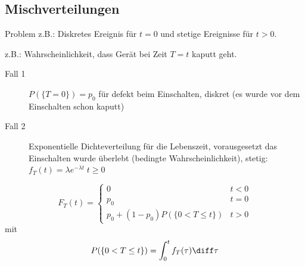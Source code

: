 \subsection{Mischverteilungen}
Problem z.B.: Diskretes Ereignis für $t = 0$ und stetige Ereignisse für $t > 0$. \\
\begin{sectionbox}
    z.B.: Wahrscheinlichkeit, dass Gerät bei Zeit $T=t$ kaputt geht.
    \begin{description}
        \item[Fall 1] $P(\{T=0\}) = p_0$ für defekt beim Einschalten, diskret (es wurde vor dem Einschalten schon kaputt)
        \item[Fall 2] Exponentielle Dichteverteilung für die Lebenszeit, vorausgesetzt das Einschalten wurde überlebt (bedingte Wahrscheinlichkeit), stetig: $f_T(t) = \lambda e^{-\lambda t} \; t \ge 0$
    \end{description}

    \begin{equation*}
        F_T(t) = \begin{cases}
            0                               & t < 0 \\
            p_0                             & t = 0 \\
            p_0 + (1-p_0)P(\{0 < T \le t\}) & t > 0
        \end{cases}
    \end{equation*}
    mit \begin{equation*}
        P(\{0 < T \le t\}) = \int_0^t f_T(\tau)\diff\tau
    \end{equation*}
\end{sectionbox}


